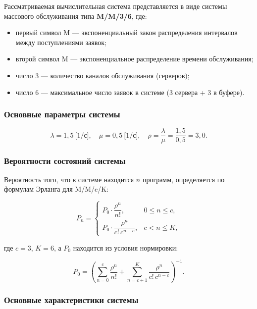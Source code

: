 \documentclass[14pt,a4paper]{extarticle}
\begin{document}
Рассматриваемая вычислительная система представляется в виде системы массового
обслуживания типа \textbf{M/M/3/6}, где:
\begin{itemize}
  \item первый символ M --- экспоненциальный закон распределения интервалов между
        поступлениями заявок;
  \item второй символ M --- экспоненциальное распределение времени обслуживания;
  \item число 3 --- количество каналов обслуживания (серверов);
  \item число 6 --- максимальное число заявок в системе (3 сервера + 3 в буфере).
\end{itemize}

\subsubsection*{Основные параметры системы}

\[
  \lambda = 1{,}5\ \text{[1/с]}, \quad
  \mu = 0{,}5\ \text{[1/с]}, \quad
  \rho = \frac{\lambda}{\mu} = \frac{1{,}5}{0{,}5} = 3{,}0.
\]

\subsubsection*{Вероятности состояний системы}

Вероятность того, что в системе находится $n$ программ, определяется по формулам
Эрланга для M/M/c/K:

\[
  P_n = \begin{cases}
    P_0 \cdot \dfrac{\rho^n}{n!}, & 0 \le n \le c, \\[8pt]
    P_0 \cdot \dfrac{\rho^n}{c!\, c^{n-c}}, & c < n \le K,
  \end{cases}
\]

где $c = 3$, $K = 6$, а $P_0$ находится из условия нормировки:

\[
  P_0 = \left(\sum_{n=0}^{c} \frac{\rho^n}{n!}
             + \sum_{n=c+1}^{K} \frac{\rho^n}{c!\, c^{n-c}}\right)^{-1}.
\]

\subsubsection*{Основные характеристики системы}
\end{document}
